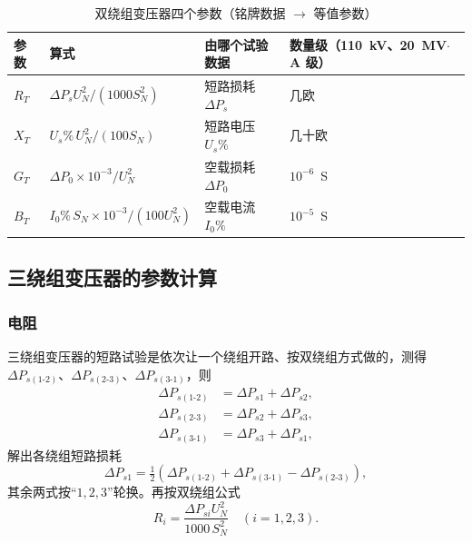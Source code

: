 \begin{table}[htbp]
  \centering
  \caption{双绕组变压器四个参数（铭牌数据 $\to$ 等值参数）}
  \small
  \begin{tabular}{@{}llll@{}}
    \toprule
    参数 & 算式 & 由哪个试验数据 & 数量级（110~kV、20~MV$\cdot$A 级） \\
    \midrule
    $R_T$ & $\Delta P_sU_N^{2}/(1000S_N^{2})$ & 短路损耗 $\Delta P_s$ & 几欧 \\
    $X_T$ & $U_s\%\,U_N^{2}/(100S_N)$ & 短路电压 $U_s\%$ & 几十欧 \\
    $G_T$ & $\Delta P_0\times10^{-3}/U_N^{2}$ & 空载损耗 $\Delta P_0$ & $10^{-6}$~S \\
    $B_T$ & $I_0\%\,S_N\times10^{-3}/(100U_N^{2})$ & 空载电流 $I_0\%$ & $10^{-5}$~S \\
    \bottomrule
  \end{tabular}
\end{table}


\subsection{三绕组变压器的参数计算}

\subsubsection{电阻}

三绕组变压器的短路试验是依次让一个绕组开路、按双绕组方式做的，测得
$\Delta P_{s(1\text{-}2)}$、$\Delta P_{s(2\text{-}3)}$、$\Delta P_{s(3\text{-}1)}$，则
\begin{align}
  \Delta P_{s(1\text{-}2)}&=\Delta P_{s1}+\Delta P_{s2},\\
  \Delta P_{s(2\text{-}3)}&=\Delta P_{s2}+\Delta P_{s3},\\
  \Delta P_{s(3\text{-}1)}&=\Delta P_{s3}+\Delta P_{s1},
\end{align}
解出各绕组短路损耗
\begin{equation}
  \Delta P_{s1}=\tfrac{1}{2}\left(\Delta P_{s(1\text{-}2)}+\Delta P_{s(3\text{-}1)}
  -\Delta P_{s(2\text{-}3)}\right),
\end{equation}
其余两式按“$1,2,3$”轮换。再按双绕组公式
\begin{equation}
  R_i=\frac{\Delta P_{si}U_N^{2}}{1000\,S_N^{2}}\quad(i=1,2,3).
\end{equation}


